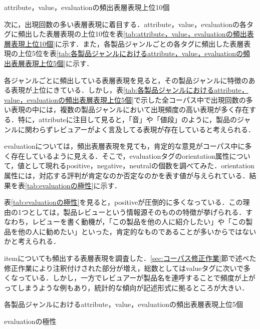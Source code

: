 \documentclass[japanese]{jnlp_1.4}
\begin{document}
\begin{table}[t]
\caption{attribute，value，evaluationの頻出表層表現上位10個}
\label{tab:attribute，value，evaluationの頻出表層表現上位10個}

\end{table}


次に，出現回数の多い表層表現に着目する．attribute，value，evaluationの各タグに頻出した表層表現の上位10位を表\ref{tab:attribute，value，evaluationの頻出表層表現上位10個}に示す．また，各製品ジャンルごとの各タグに頻出した表層表現の上位5位を表\ref{tab:各製品ジャンルにおけるattribute，value，evaluationの頻出表層表現上位5個}に示す．

各ジャンルごとに頻出している表層表現を見ると，その製品ジャンルに特徴のある表現が上位にきている．しかし，表\ref{tab:各製品ジャンルにおけるattribute，value，evaluationの頻出表層表現上位5個}で示した全コーパス中で出現回数の多い表現の中には，複数の製品ジャンルにおいて出現頻度の高い表現が多く存在する．特に，attributeに注目して見ると，「音」や「値段」のように，製品のジャンルに関わらずレビュアーがよく言及してる表現が存在していると考えられる．

evaluationについては，頻出表層表現を見ても，肯定的な意見がコーパス中に多く存在しているように見える．そこで，evaluationタグのorientation属性について，値として現れるpositive，negative，neutralの個数を調べてみた．orientation属性には，対応する評判が肯定なのか否定なのかを表す値が与えられている．結果を表\ref{tab:evaluationの極性}に示す．

表\ref{tab:evaluationの極性}を見ると，positiveが圧倒的に多くなっている．この理由の1つとしては，製品レビューという情報源そのものの特徴が挙げられる．すなわち，レビューを書く動機が，「この製品を他の人に紹介したい」や「この製品を他の人に勧めたい」といった，肯定的なものであることが多いからではないかと考えられる．


itemについても頻出する表層表現を調査した．\ref{sec:コーパス修正作業}節で述べた修正作業により注釈付けされた部分が増え，総数としてはvalueタグに次いで多くなっている．しかし，一方でレビュアーが製品名を連呼することで頻度が上がってしまうような例もあり，統計的な傾向が記述形式に拠るところが大きい．


\begin{table}[p]
\caption{各製品ジャンルにおけるattribute，value，evaluationの頻出表層表現上位5個}
\label{tab:各製品ジャンルにおけるattribute，value，evaluationの頻出表層表現上位5個}

\end{table}
\begin{table}[p]
\caption{evaluationの極性}
\label{tab:evaluationの極性}

\end{table}
\end{document}
